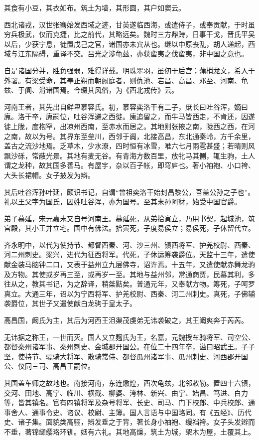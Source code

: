 \documentclass[12pt,UTF8]{ctexbook}
\begin{document}
其食有小豆，其衣如布。筑土为墙，其形圆，其户如窦云。

西北诸戎，汉世张骞始发西域之迹，甘英遂临西海，或遣侍子，或奉贡献，于时虽穷兵极武，仅而克捷，比之前代，其略远矣。魏时三方鼎跱，日事干戈，晋氏平吴以后，少获宁息，徒置戊己之官，诸国亦未宾从也。继以中原丧乱，胡人递起，西域与江东隔碍，重译不交。吕光之涉龟兹，亦获蛮夷之伐蛮夷，非中国之意也。

自是诸国分并，胜负强弱，难得详载。明珠翠羽，虽仞于后宫；蒲梢龙文，希入于外署。有梁受命，其奉正朔而朝阙庭者，则仇池、宕昌、高昌、邓至、河南、龟兹、于阗、滑诸国焉。今缀其风俗，为《西北戎传》云。

河南王者，其先出自鲜卑慕容氏。初，慕容奕洛干有二子，庶长曰吐谷浑，嫡曰廆。洛干卒，廆嗣位，吐谷浑避之西徙。廆追留之，而牛马皆西走，不肯还，因遂徙上陇，度枹罕，出凉州西南，至赤水而居之。其地则张掖之南，陇西之西，在河之南，故以为号。其界东至垒川，西邻于阗，北接高昌，东北通秦岭，方千余里，盖古之流沙地焉。乏草木，少水潦，四时恒有冰雪，唯六七月雨雹甚盛；若晴则风飘沙砾，常蔽光景。其地有麦无谷。有青海方数百里，放牝马其侧，辄生驹，土人谓之龙种，故其国多善马。有屋宇，杂以百子帐，即穹庐也。著小袖袍、小口袴、大头长裙帽。女子披发为辫。

其后吐谷浑孙叶延，颇识书记，自谓“曾祖奕洛干始封昌黎公，吾盖公孙之子也”。礼以王父字为国氏，因姓吐谷浑，亦为国号。至其末孙阿豺，始受中国官爵。

弟子慕延，宋元嘉末又自号河南王。慕延死，从弟拾寅立，乃用书契，起城池，筑宫殿，其小王并立宅。国中有佛法。拾寅死，子度易侯立；易侯死，子休留代立。

齐永明中，以代为使持节、都督西秦、河、沙三州、镇西将军、护羌校尉、西秦、河二州刺史。梁兴，进代为征西将军。代死，子休运筹袭爵位。天监十三年，遣使献金装马脑钟二口，又表于益州立九层佛寺，诏许焉。十五年，又遣使献赤舞龙驹及方物。其使或岁再三至，或再岁一至。其地与益州邻，常通商贾，民慕其利，多往从之，教其书记，为之辞译，稍桀黠矣。普通元年，又奉献方物。筹死，子呵罗真立。大通三年，诏以为宁西将军、护羌校尉、西秦、河二州刺史。真死，子佛辅袭爵位，其世子又遣使献白龙驹于皇太子。

高昌国，阚氏为主，其后为河西王沮渠茂虔弟无讳袭破之，其王阚爽奔于芮芮。

无讳据之称王，一世而灭。国人又立麹氏为王，名嘉，元魏授车骑将军、司空公、都督秦州诸军事、秦州刺史、金城郡开国公。在位二十四年卒，谥曰昭武王。子子坚，使持节、骠骑大将军、散骑常侍、都督瓜州诸军事、瓜州刺史、河西郡开国公、仪同三司、高昌王嗣位。

其国盖车师之故地也。南接河南，东连燉煌，西次龟兹，北邻敕勒。置四十六镇，交河、田地、高宁、临川、横截、柳婆、洿林、新兴、由宁、始昌、笃进、白力等，皆其镇名。官有四镇将军及杂号将军、长史、司马、门下校郎、中兵校郎、通事舍人、通事令史、谘议、校尉、主簿。国人言语与中国略同。有《五经》、历代史、诸子集。面貌类高骊，辫发垂之于背，著长身小袖袍、缦裆袴。女子头发辫而不垂，著锦缬缨珞环钏。姻有六礼。其地高燥，筑土为城，架木为屋，土覆其上。
\end{document}
